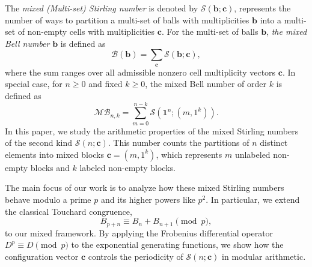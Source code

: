 \documentclass[12pt]{amsart}
\theoremstyle{definition}
\begin{document}
The \textit{mixed (Multi-set) Stirling number} is denoted by $\mathcal{S}(\mathbf{b}; \mathbf{c})$, represents the number of ways to partition a multi-set of balls with multiplicities $\mathbf{b}$ into a multi-set of non-empty cells with multiplicities $\mathbf{c}$. For the multi-set of balls  $\mathbf{b}$, \textit{the mixed Bell number} $\mathbf{b}$ is defined as
\begin{equation}
    \mathcal{B}(\mathbf{b})
    =
    \sum_{\mathbf{c}}
    \mathcal{S}(\mathbf{b};\mathbf{c}),
\end{equation}
where the sum ranges over all admissible nonzero cell multiplicity vectors $\mathbf{c}$.
In special case, for $n \ge 0$ and fixed $k \ge 0$, the mixed Bell number of order $k$ is defined as
\begin{equation}
    \mathcal{MB}_{n,k}=\sum_{m=0}^{n-k}\mathcal{S}(\mathbf{1}^n;(m,1^k)).
\end{equation}
In this paper, we study the arithmetic properties of the mixed Stirling numbers of the second kind $\mathcal{S}(n; \mathbf{c})$. This number counts the partitions of $n$ distinct elements into mixed blocks $\mathbf{c} = (m, 1^k)$, which represents $m$ unlabeled non-empty blocks and $k$ labeled non-empty blocks.

The main focus of our work is to analyze how these mixed Stirling numbers behave modulo a prime $p$ and its higher powers like $p^2$. In particular, we extend the classical Touchard congruence,
\[
B_{p+n} \equiv B_n + B_{n+1} \pmod p,
\]
to our mixed framework. By applying the Frobenius differential operator $D^p \equiv D \pmod p$ to the exponential generating functions, we show how the configuration vector $\mathbf{c}$ controls the periodicity of $\mathcal{S}(n; \mathbf{c})$ in modular arithmetic.
\end{document}
